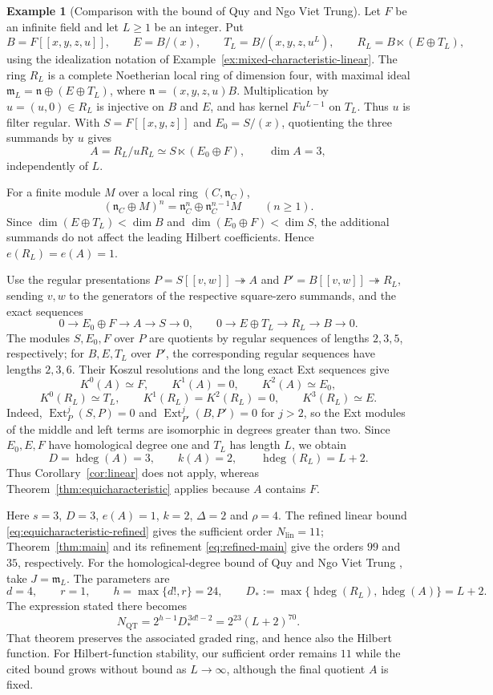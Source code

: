 \documentclass[11pt,reqno]{amsart}
\numberwithin{equation}{section}
\theoremstyle{definition}
\newtheorem{example}[theorem]{Example}
\newcommand{\m}{\mathfrak m}
\newcommand{\hdeg}{\operatorname{hdeg}}
\newcommand{\Ext}{\operatorname{Ext}}
\begin{document}
\begin{example}[Comparison with the bound of Quy and Ngo Viet Trung]
\label{ex:qt-hdeg-comparison}
Let $F$ be an infinite field and let $L\ge1$ be an integer. Put
\[
 B=F[[x,y,z,u]],\qquad E=B/(x),\qquad
 T_L=B/(x,y,z,u^L),\qquad R_L=B\ltimes(E\oplus T_L),
\]
using the idealization notation of
Example~\ref{ex:mixed-characteristic-linear}.
The ring $R_L$ is a complete Noetherian local ring of dimension four,
with maximal ideal $\m_L=\mathfrak n\oplus(E\oplus T_L)$, where
$\mathfrak n=(x,y,z,u)B$.
Multiplication by $u=(u,0)\in R_L$ is injective on $B$ and $E$,
and has kernel $Fu^{L-1}$ on $T_L$. Thus $u$ is filter regular.
With $S=F[[x,y,z]]$ and $E_0=S/(x)$, quotienting the three summands
by $u$ gives
\[
 A=R_L/uR_L\simeq S\ltimes(E_0\oplus F),\qquad \dim A=3,
\]
independently of $L$.

For a finite module $M$ over a local ring $(C,\mathfrak n_C)$,
\[
 (\mathfrak n_C\oplus M)^n
 =\mathfrak n_C^n\oplus\mathfrak n_C^{n-1}M\qquad(n\ge1).
\]
Since $\dim(E\oplus T_L)<\dim B$ and
$\dim(E_0\oplus F)<\dim S$, the additional summands do not affect
the leading Hilbert coefficients. Hence $e(R_L)=e(A)=1$.

Use the regular presentations $P=S[[v,w]]\twoheadrightarrow A$
and $P'=B[[v,w]]\twoheadrightarrow R_L$, sending $v,w$ to the
generators of the respective square-zero summands, and the exact sequences
\[
 0\longrightarrow E_0\oplus F\longrightarrow A\longrightarrow S\longrightarrow0,
 \qquad
 0\longrightarrow E\oplus T_L\longrightarrow R_L\longrightarrow B\longrightarrow0.
\]
The modules $S,E_0,F$ over $P$ are quotients by regular sequences
of lengths $2,3,5$, respectively; for $B,E,T_L$ over $P'$,
the corresponding regular sequences have lengths $2,3,6$.
Their Koszul resolutions and the long exact Ext sequences give
\[
 K^0(A)\simeq F,\qquad K^1(A)=0,\qquad K^2(A)\simeq E_0,
\]
\[
 K^0(R_L)\simeq T_L,\qquad K^1(R_L)=K^2(R_L)=0,
 \qquad K^3(R_L)\simeq E.
\]
Indeed, $\Ext_P^j(S,P)=0$ and $\Ext_{P'}^j(B,P')=0$ for $j>2$,
so the Ext modules of the middle and left terms are isomorphic
in degrees greater than two. Since $E_0,E,F$ have homological degree one and
$T_L$ has length $L$, we obtain
\[
 D=\hdeg(A)=3,\qquad k(A)=2,\qquad \hdeg(R_L)=L+2.
\]
Thus Corollary~\ref{cor:linear} does not apply, whereas
Theorem~\ref{thm:equicharacteristic} applies because $A$ contains $F$.

Here $s=3$, $D=3$, $e(A)=1$, $k=2$, $\Delta=2$ and $\rho=4$.
The refined linear bound \eqref{eq:equicharacteristic-refined}
gives the sufficient order $N_{\mathrm{lin}}=11$;
Theorem~\ref{thm:main} and its refinement \eqref{eq:refined-main}
give the orders $99$ and $35$, respectively.
For the homological-degree bound of Quy and Ngo Viet Trung
\cite[Theorem~4.5]{QT}, take $J=\m_L$. The parameters are
\[
 d=4,\qquad r=1,\qquad h=\max\{d!,r\}=24,\qquad
 D_*:=\max\{\hdeg(R_L),\hdeg(A)\}=L+2.
\]
The expression stated there becomes
\[
 N_{\mathrm{QT}}=2^{h-1}D_*^{\,3d!-2}=2^{23}(L+2)^{70}.
\]
That theorem preserves the associated graded ring, and hence also
the Hilbert function. For Hilbert-function stability, our sufficient
order remains $11$ while the cited bound grows without bound as
$L\to\infty$, although the final quotient $A$ is fixed.
\end{example}
\end{document}
